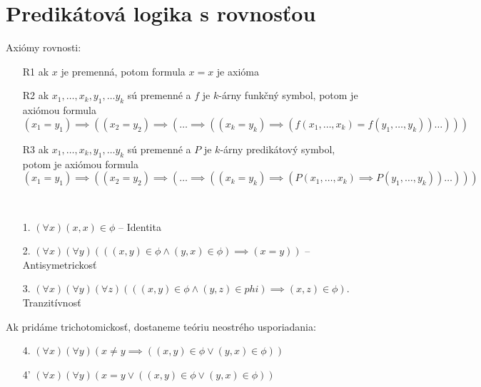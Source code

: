 \section{Predikátová logika s rovnosťou}

\par{Axiómy rovnosti:}
~
\begin{itemize}
    \item[R1] ak $x$ je premenná, potom formula $x=x$ je axióma
    \item[R2] ak $x_1,\dots,x_k, y_1, \dots y_k$ sú premenné a 
        $f$ je $k$-árny funkčný symbol, potom je axiómou formula
        \begin{equation*}
            (x_1 = y_1) \implies ( (x_2 = y_2) \implies ( \dots
                \implies ((x_k = y_k) \implies
                    (f(x_1,\dots,x_k) = f(y_1,\dots,y_k)) \dots )))
        \end{equation*}
    \item[R3] ak $x_1,\dots,x_k, y_1, \dots y_k$ sú premenné a 
        $P$ je $k$-árny predikátový symbol, potom je axiómou formula
        \begin{equation*}
            (x_1 = y_1) \implies ( (x_2 = y_2) \implies ( \dots
                \implies ((x_k = y_k) \implies
                    (P(x_1,\dots,x_k) \implies P(y_1,\dots,y_k)) \dots )))
        \end{equation*}
\end{itemize}

\begin{priklad}
~
    \begin{itemize}
        \item[1.] $(\forall x) (x,x) \in \phi$ -- Identita
        \item[2.] $(\forall x) (\forall y) (((x,y) \in \phi \land
            (y,x) \in \phi) \implies (x=y))$ -- Antisymetrickosť
        \item[3.] $(\forall x) (\forall y) (\forall z)
            (((x,y) \in \phi \land (y,z) \in phi) \implies
                (x,z) \in \phi)$. Tranzitívnosť
    \end{itemize}
    Ak pridáme trichotomickosť, dostaneme teóriu neostrého
    usporiadania:
    \begin{itemize}
        \item[4.] $(\forall x) (\forall y) (x \not=y \implies
            ((x,y) \in \phi \lor (y,x) \in \phi))$
        \item[4'] $(\forall x) (\forall y) (x = y \lor
            ((x,y) \in \phi \lor (y,x) \in \phi))$
    \end{itemize}
\end{priklad}

